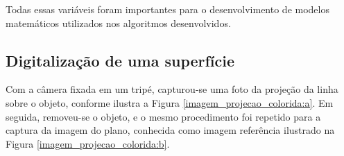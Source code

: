 \documentclass[a4paper, 12pt]{article}
\begin{document}
Todas essas variáveis foram importantes para o desenvolvimento de modelos matemáticos utilizados nos algoritmos desenvolvidos. 


\subsection{Digitalização de uma superfície}
\label{subsec:digitaliza}

Com a câmera fixada em um tripé, capturou-se uma foto da projeção da linha sobre o objeto, conforme ilustra a Figura \ref{imagem_projecao_colorida:a}. Em seguida, removeu-se o objeto, e o mesmo procedimento foi repetido para a captura da imagem do plano, conhecida como imagem referência ilustrado na Figura \ref{imagem_projecao_colorida:b}. 
\end{document}
